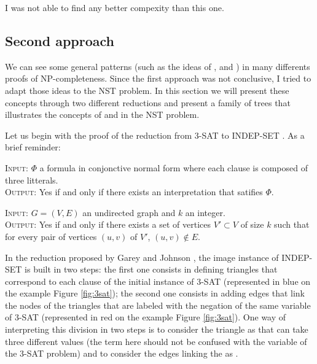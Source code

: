I was not able to find any better compexity than this one. 

\subsection{Second approach}
We can see some general patterns (such as the ideas of \variables, \widgets and
\constraints) in many differents proofs of NP-completeness. Since the
first approach was not conclusive, I tried to adapt those ideas to the
NST problem. In this section we will present these concepts through
two different reductions and present a family of trees that
illustrates the concepts of \variables and \widgets in the NST problem.

Let us begin with the proof of the reduction from 3-SAT to INDEP-SET
\cite{polytech}. As a brief reminder:

\begin{definition}[3-SAT]
\textsc{Input:} $\Phi$ a formula in conjonctive normal form where each
clause is composed of three litterals. \\
\textsc{Output:} Yes if and only if there exists an interpretation
that satifies $\Phi$.\\
\end{definition}

\begin{definition} 
\textsc{Input:} $G=(V,E)$ an undirected graph and $k$ an integer.\\
\textsc{Output:} Yes if and only if there exists a set of vertices
$V' \subset V$ of size $k$ such that for every pair of vertices
$(u,v)$ of $V'$, $(u,v) \notin E$.\\
\end{definition}

  

In the reduction proposed by Garey and Johnson \cite{garey}, the image
instance of INDEP-SET is built in two steps: the first one consists in
defining triangles that correspond to each clause of the initial
instance of 3-SAT (represented in blue on the example Figure
\ref{fig:3sat}); the second one consists in adding edges that link the
nodes of the triangles that are labeled with the negation of the same
variable of 3-SAT (represented in red on the example Figure
\ref{fig:3sat}). One way of interpreting this division in two steps is
to consider the triangle \widgets as \variables that can take three
different values (the \variable term here should not be confused with
the variable of the 3-SAT problem) and to consider the edges linking
the \widgets as \constraints.

